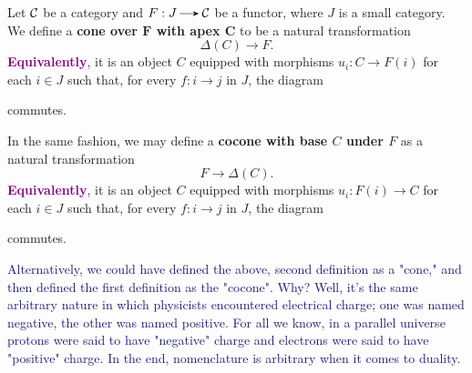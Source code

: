     \begin{definition}
        Let $\mathcal{C}$ be a category and $F: J \to \cc$ be a functor, where
        $J$ is a small category. We define a 
        \textbf{cone over $\bm{F}$ with apex $\bm{C}$}
        to be a natural transformation 
        \[
            \Delta(C) \to F.  
        \]
        \textbf{\textcolor{purple}{Equivalently}}, it
        is an object $C$ equipped with morphisms 
        $u_i: C \to F(i)$ for each $i \in J$ 
        such that, for every $f: i \to j$ in $J$,
        the diagram 
        \begin{center}
        \end{center}
        commutes.

        In the same fashion, we may define a \textbf{cocone with base
        $C$ under $F$} as a natural transformation 
        \[
            F \to \Delta(C).
        \]
        \textbf{\textcolor{purple}{Equivalently}}, it 
        is an object $C$ equipped with morphisms $u_i: F(i) \to C$ 
        for each $i \in J$ such that, for every $f: i \to j$ in $J$,
        the diagram
        \begin{center}
        \end{center}
        commutes. 
    \end{definition}

    \textcolor{MidnightBlue}{Alternatively, we could have defined the
    above, second definition as a "cone," and then defined the first
    definition as the "cocone". Why? Well, it's the same arbitrary
    nature in which physicists encountered electrical charge; one was
    named negative, the other was named positive. 
    For all we know, in a parallel
    universe protons were said to have "negative" charge and 
    electrons were said to have "positive" charge. In the end, nomenclature  
    is arbitrary when it comes to duality.
    }

